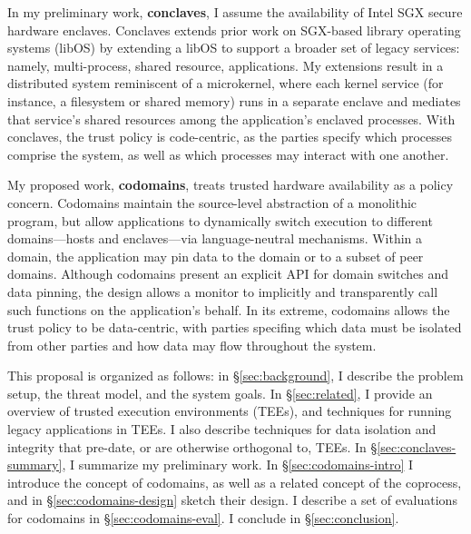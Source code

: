 %
In my preliminary work, \textbf{conclaves}, I assume the availability of Intel
SGX secure hardware enclaves.
%
Conclaves extends prior work on SGX-based library operating systems (libOS) by
extending a libOS to support a broader set of legacy services: namely,
multi-process, shared resource, applications.
%
My extensions result in a distributed system reminiscent of a microkernel,
where each kernel service (for instance, a filesystem or shared memory)
runs in a separate enclave and mediates that service’s shared resources
among the application's enclaved processes.
%
With conclaves, the trust policy is code-centric, as the parties specify which
processes comprise the system, as well as which processes may interact with one
another.


My proposed work, \textbf{codomains}, treats trusted hardware availability as a
policy concern.
%
Codomains maintain the source-level abstraction of a monolithic program, but
allow applications to dynamically switch execution to different domains---hosts
and enclaves---via language-neutral mechanisms.
%
Within a domain, the application may pin data to the domain or to a subset of
peer domains.
%
Although codomains present an explicit API for domain switches and data
pinning, the design allows a monitor to implicitly and transparently call such
functions on the application's behalf.
%
In its extreme, codomains allows the trust policy to be data-centric, with parties
specifing which data must be isolated from other parties and how data may flow
throughout the system.


This proposal is organized as follows: in \S\ref{sec:background}, I describe
the problem setup, the threat model, and the system goals.
%
In \S\ref{sec:related}, I provide an overview of trusted execution
environments (TEEs), and techniques for running legacy applications
in TEEs.
%
I also describe techniques for data isolation and integrity that pre-date, or
are otherwise orthogonal to, TEEs.
%
In \S\ref{sec:conclaves-summary}, I summarize my preliminary work.
%
In \S\ref{sec:codomains-intro} I introduce the concept of codomains, as well as
a related concept of the coprocess, and in \S\ref{sec:codomains-design} sketch
their design.
%
I describe a set of evaluations for codomains in \S\ref{sec:codomains-eval}.
%
I conclude in \S\ref{sec:conclusion}.


